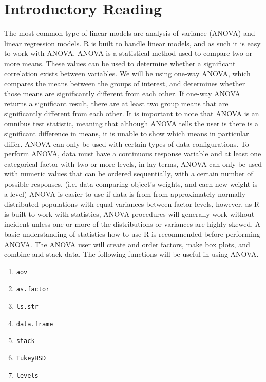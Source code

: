 
\section{Introductory Reading}


The most common type of linear models are analysis of variance (ANOVA) and linear regression models. 
R is built to handle linear models, and as such it is easy to work with ANOVA. 
ANOVA is a statistical method used to compare two or more means. 
These values can be used to determine whether a significant correlation exists between variables. 
We will be using one-way ANOVA, which compares the means between the groups of interest, and determines whether those means are significantly different from each other. 
If one-way ANOVA returns a significant result, there are at least two group means that are significantly different from each other. 
It is important to note that ANOVA is an omnibus test statistic, meaning that although ANOVA tells the user is there is a significant difference in means, it is unable to show which means in particular differ.
ANOVA can only be used with certain types of data configurations. 
To perform ANOVA, data must have a continuous response variable and at least one categorical factor with two or more levels, in lay terms, ANOVA can only be used with numeric values that can be ordered sequentially, with a certain number of possible responses. 
(i.e. data comparing object's weights, and each new weight is a level) 
ANOVA is easier to use if data is from from approximately normally distributed populations with equal variances between factor levels, however, as R is built to work with statistics, ANOVA procedures will generally work without incident unless one or more of the distributions or variances are highly skewed.
A basic understanding of statistics how to use R is recommended before performing ANOVA. The ANOVA user will create and order factors, make box plots, and combine and stack data. 
\cite{cran-r}
The following functions will be useful in using ANOVA.
\begin{enumerate}
        \item \texttt{aov}
        \item \texttt{as.factor}
        \item \texttt{ls.str}
        \item \texttt{data.frame}
        \item \texttt{stack}
        \item \texttt{TukeyHSD}
\item \texttt{levels}
\end{enumerate}

